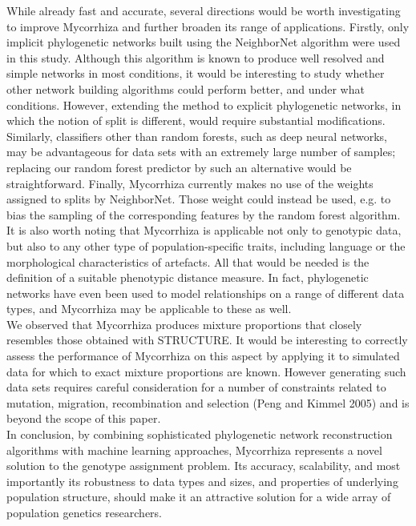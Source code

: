\documentclass{bioinfo}
\begin{document}
While already fast and accurate, several directions would be worth investigating to improve Mycorrhiza and further broaden its range of applications. Firstly, only implicit phylogenetic networks built using the NeighborNet algorithm were used in this study. Although this algorithm is known to produce well resolved and simple networks in most conditions, it would be interesting to study whether other network building algorithms could perform better, and under what conditions. However, extending the method to explicit phylogenetic networks, in which the notion of split is different, would require substantial modifications. Similarly, classifiers other than random forests, such as deep neural networks, may be advantageous for data sets with an extremely large number of samples; replacing our random forest predictor by such an alternative would be straightforward. Finally, Mycorrhiza currently makes no use of the weights assigned to splits by NeighborNet. Those weight could instead be used, e.g. to bias the sampling of the corresponding features by the random forest algorithm.\\ 
It is also worth noting that Mycorrhiza is applicable not only to genotypic data, but also to any other type of population-specific traits, including language or the morphological characteristics of artefacts. All that would be needed is the definition of a suitable phenotypic distance measure. In fact, phylogenetic networks have even been used to model relationships on a range of different data types, and Mycorrhiza may be applicable to these as well.\\
We observed that Mycorrhiza produces mixture proportions that closely resembles those obtained with STRUCTURE. It would be interesting to correctly assess the performance of Mycorrhiza on this aspect by applying it to simulated data for which to exact mixture proportions are known. However generating such data sets requires careful consideration for a number of constraints related to mutation, migration, recombination and selection (Peng and Kimmel 2005) and is beyond the scope of this paper.\\
In conclusion, by combining sophisticated phylogenetic network reconstruction algorithms with machine learning approaches, Mycorrhiza represents a novel solution to the genotype assignment problem. Its accuracy, scalability, and most importantly its robustness to data types and sizes, and properties of underlying population structure, should make it an attractive solution for a wide array of population genetics researchers.
\end{document}
